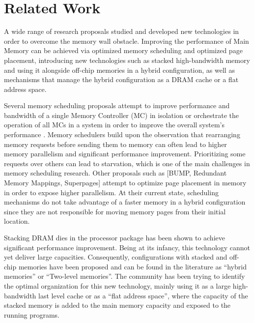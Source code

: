 
\section{Related Work}
\label{sec:Background}

A wide range of research proposals studied and developed new technologies in order to overcome the memory wall obstacle. Improving the performance of Main Memory can be achieved via optimized memory scheduling and optimized page placement, introducing new technologies such as stacked high-bandwidth memory and using it alongside off-chip memories in a hybrid configuration, as well as mechanisms that manage the hybrid configuration as a DRAM cache or a flat address space.

Several memory scheduling proposals attempt to improve performance and bandwidth of a single Memory Controller (MC) in isolation \cite{TCM,PARBS,SMS} or orchestrate the operation of all MCs in a system in order to improve the overall system's performance \cite{ATLAS}. Memory schedulers build upon the observation that rearranging memory requests before sending them to memory can often lead to higher memory parallelism and significant performance improvement. Prioritizing some requests over others can lead to starvation, which is one of the main challenges in memory scheduling research. Other proposals such as [BUMP, Redundant Memory Mappings, Superpages]\cite{BUMP,RMM,SUPERPAGES} attempt to optimize page placement in memory in order to expose higher parallelism. At their current state, scheduling mechanisms do not take advantage of a faster memory in a hybrid configuration since they are not responsible for moving memory pages from their initial location.

Stacking DRAM dies in the processor package has been shown to achieve significant performance improvement. Being at its infancy, this technology cannot yet deliver large capacities\cite{JEDEC-HBM-REVISED}. Consequently, configurations with stacked and off-chip memories have been proposed \cite{LOH-HYBRID,qureshi-micro2012} and can be found in the literature as ``hybrid memories'' or ``Two-level memories''. The community has been trying to identify the optimal organization for this new technology, mainly using it as a large high-bandwidth last level cache or as a ``flat address space'', where the capacity of the stacked memory is added to the main memory capacity and exposed to the running programs.

